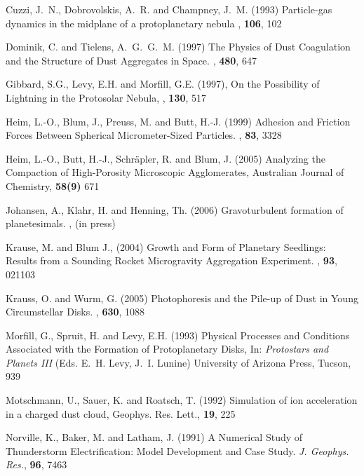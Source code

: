 \begin{literature}
\item Cuzzi, J.~N., Dobrovolskis, A.~R. and Champney, J.~M. (1993)
Particle-gas dynamics in the midplane of a protoplanetary nebula
\ica, \textbf{106}, 102

\item Dominik, C. and Tielens,  A.~G.~G.~M. (1997) The Physics of
Dust Coagulation and the Structure of Dust Aggregates in Space.
\ica, \textbf{480}, 647

\item Gibbard, S.G., Levy, E.H. and Morfill, G.E. (1997), On the
Possibility of Lightning in the Protosolar Nebula, \ica,
\textbf{130}, 517

\item Heim, L.-O., Blum, J., Preuss, M. and Butt, H.-J. (1999)
Adhesion and Friction Forces Between Spherical Micrometer-Sized
Particles. \prl, \textbf{83}, 3328

\item Heim, L.-O., Butt, H.-J., Schr\"apler, R. and Blum, J.
(2005) Analyzing the Compaction of High-Porosity Microscopic
Agglomerates, Australian Journal of Chemistry, \textbf{58(9)} 671

\item Johansen, A., Klahr, H. and  Henning, Th. (2006)
Gravoturbulent formation of planetesimals. \apj, (in press)

\item Krause, M. and Blum J., (2004) Growth and Form of Planetary
Seedlings: Results from a Sounding Rocket Microgravity Aggregation
Experiment. \prl, \textbf{93}, 021103

\item Krauss, O. and Wurm, G. (2005) Photophoresis and the Pile-up
of Dust in Young Circumstellar Disks. \apj, \textbf{630}, 1088

\item Morfill, G., Spruit, H. and Levy, E.H. (1993) Physical
Processes and Conditions Associated with the Formation of
Protoplanetary Disks, In: \textit{Protostars and Planets III}
(Eds. E.~H. Levy, J.~I. Lunine) University of Arizona Press,
Tucson, 939

\item Motschmann, U., Sauer, K. and Roatsch, T. (1992) Simulation
of ion acceleration in a charged dust cloud, Geophys. Res. Lett.,
\textbf{19}, 225

\item Norville, K., Baker, M. and Latham, J. (1991) A Numerical
Study of Thunderstorm Electrification: Model Development and Case
Study. {\it J. Geophys. Res.}, \textbf{96}, 7463


\end{literature}
